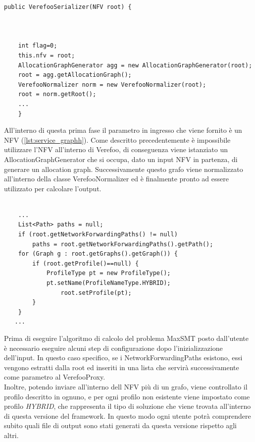 \begin{lstlisting}[caption={Inizializzazione e normalizzazione input}, label=lst:java_example1]
    public VerefooSerializer(NFV root) {



    int flag=0;
    this.nfv = root;
    AllocationGraphGenerator agg = new AllocationGraphGenerator(root);
    root = agg.getAllocationGraph();
    VerefooNormalizer norm = new VerefooNormalizer(root);
    root = norm.getRoot();
    ... 
    }
\end{lstlisting}
All'interno di questa prima fase il parametro in ingresso che viene fornito è un NFV (\ref{lst:service_graphh}). Come descritto precedentemente è impossibile utilizzare l'NFV 
all'interno di Verefoo, di conseguenza viene istanziato un AllocationGraphGenerator che si occupa, dato un input NFV in partenza, di generare un allocation graph. Successivamente 
questo grafo viene normalizzato all'interno della classe VerefooNormalizer ed è finalmente pronto ad essere utilizzato per calcolare l'output.
\begin{lstlisting}[caption={Calcolo dei Paths e dei profili nell'input}, label=lst:java_example2]
     
    ...
    List<Path> paths = null;
    if (root.getNetworkForwardingPaths() != null)
        paths = root.getNetworkForwardingPaths().getPath();
    for (Graph g : root.getGraphs().getGraph()) {
        if (root.getProfile()==null) {
            ProfileType pt = new ProfileType();
            pt.setName(ProfileNameType.HYBRID);
                root.setProfile(pt);
        } 
    }
   ...  
\end{lstlisting}

Prima di eseguire l'algoritmo di calcolo del problema MaxSMT posto dall'utente è necessario eseguire alcuni step di configurazione dopo l'inizializzazione dell'input.
In questo caso specifico, se i NetworkForwardingPaths esistono, essi vengono estratti dalla root ed inseriti in una lista che servirà successivamente come parametro al VerefooProxy.\\
Inoltre, potendo inviare all'interno dell NFV più di un grafo, viene controllato il profilo descritto in ognuno, e per ogni profilo non esistente viene impostato come profilo
\textit{HYBRID}, che rappresenta il tipo di soluzione che viene trovata all'interno di questa versione del framework. In questo modo ogni utente potrà comprendere subito quali
file di output sono stati generati da questa versione rispetto agli altri. 


\newpage


